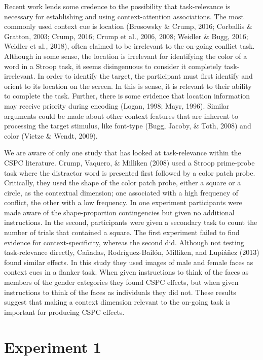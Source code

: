 \documentclass[english,,man,floatsintext]{apa6}
\begin{document}
Recent work lends some credence to the possibility that task-relevance is necessary for establishing and using context-attention associations. The most commonly used context cue is location (Brosowsky \& Crump, 2016; Corballis \& Gratton, 2003; Crump, 2016; Crump et al., 2006, 2008; Weidler \& Bugg, 2016; Weidler et al., 2018), often claimed to be irrelevant to the on-going conflict task. Although in some sense, the location is irrelevant for identifying the color of a word in a Stroop task, it seems disingenuous to consider it completely task-irrelevant. In order to identify the target, the participant must first identify and orient to its location on the screen. In this is sense, it is relevant to their ability to complete the task. Further, there is some evidence that location information may receive priority during encoding (Logan, 1998; Mayr, 1996). Similar arguments could be made about other context features that are inherent to processing the target stimulus, like font-type (Bugg, Jacoby, \& Toth, 2008) and color (Vietze \& Wendt, 2009).

We are aware of only one study that has looked at task-relevance within the CSPC literature. Crump, Vaquero, \& Milliken (2008) used a Stroop prime-probe task where the distractor word is presented first followed by a color patch probe. Critically, they used the shape of the color patch probe, either a square or a circle, as the contextual dimension; one associated with a high frequency of conflict, the other with a low frequency. In one experiment participants were made aware of the shape-proportion contingencies but given no additional instructions. In the second, participants were given a secondary task to count the number of trials that contained a square. The first experiment failed to find evidence for context-specificity, whereas the second did. Although not testing task-relevance directly, Cañadas, Rodríguez-Bailón, Milliken, and Lupiáñez (2013) found similar effects. In this study they used images of male and female faces as context cues in a flanker task. When given instructions to think of the faces as members of the gender categories they found CSPC effects, but when given instructions to think of the faces as individuals they did not. These results suggest that making a context dimension relevant to the on-going task is important for producing CSPC effects.

\hypertarget{experiment-1}{%
\section{Experiment 1}\label{experiment-1}}
\end{document}
